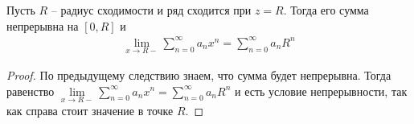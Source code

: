 \begin{follow}
    Пусть $R$ -- радиус сходимости и ряд сходится при $z = R$. 
    Тогда его сумма непрерывна на $[0, R]$ и 
    \begin{gather*}
        \lim\limits_{x \to R-} \sum\limits_{n=0}^\infty a_nx^n = \sum\limits_{n=0}^\infty a_nR^n
    \end{gather*}
\end{follow}
\begin{proof}
    По предыдущему следствию знаем, что сумма будет непрерывна. 
    Тогда равенство $\lim\limits_{x \to R-} \sum\limits_{n=0}^\infty a_nx^n = \sum\limits_{n=0}^\infty a_nR^n$ и есть условие непрерывности, так как справа стоит значение в точке $R$.
\end{proof}